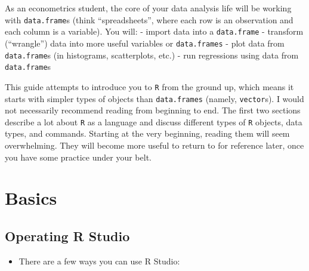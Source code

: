 \documentclass[]{book}
\providecommand{\tightlist}{%
  \setlength{\itemsep}{0pt}\setlength{\parskip}{0pt}}
\theoremstyle{definition}
\theoremstyle{definition}
\theoremstyle{definition}
\theoremstyle{remark}
\begin{document}
As an econometrics student, the core of your data analysis life will be
working with \texttt{data.frame}s (think ``spreadsheets'', where each
row is an observation and each column is a variable). You will: - import
data into a \texttt{data.frame} - transform (``wrangle'') data into more
useful variables or \texttt{data.frames} - plot data from
\texttt{data.frame}s (in histograms, scatterplots, etc.) - run
regressions using data from \texttt{data.frame}s

This guide attempts to introduce you to \texttt{R} from the ground up,
which means it starts with simpler types of objects than
\texttt{data.frames} (namely, \texttt{vector}s). I would not necessarily
recommend reading from beginning to end. The first two sections describe
a lot about \texttt{R} as a language and discuss different types of
\texttt{R} objects, data types, and commands. Starting at the very
beginning, reading them will seem overwhelming. They will become more
useful to return to for reference later, once you have some practice
under your belt.

\chapter{Basics}\label{basics}

\section{Operating R Studio}\label{operating-r-studio}

\begin{itemize}
\tightlist
\item
  There are a few ways you can use R Studio:
\end{itemize}
\end{document}
